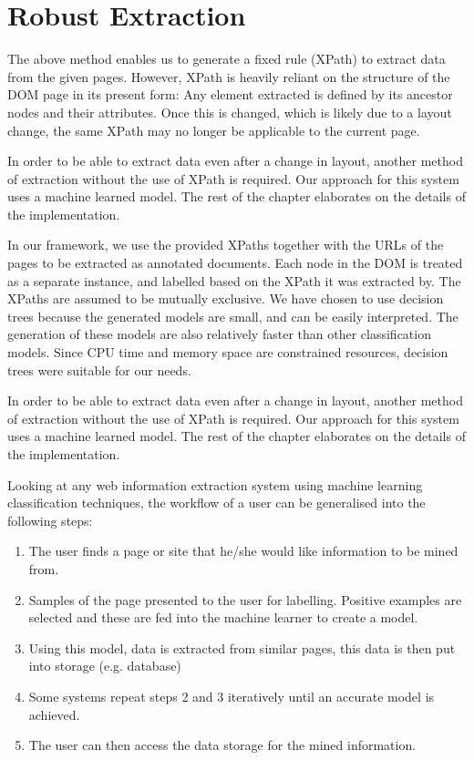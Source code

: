 \section{Robust Extraction}
\label{section:extraction}
The above method enables us to generate a fixed rule (XPath) to extract data from the given pages. However, XPath is heavily reliant on the structure of the DOM page in its present form: Any element extracted is defined by its ancestor nodes and their attributes. Once this is changed, which is likely due to a layout change, the same XPath may no longer be applicable to the current page. 

In order to be able to extract data even after a change in layout, another method of extraction without the use of XPath is required. Our approach for this system uses a machine learned model. The rest of the chapter elaborates on the details of the implementation.

In our framework, we use the provided XPaths together with the URLs of the pages to be extracted as annotated documents. Each node in the DOM is treated as a separate instance, and labelled based on the XPath it was extracted by. The XPaths are assumed to be mutually exclusive. We have chosen to use decision trees because the generated models are small, and can be easily interpreted. The generation of these models are also relatively faster than other classification models. Since CPU time and memory space are constrained resources, decision trees were suitable for our needs.



In order to be able to extract data even after a change in layout, another method of extraction without the use of XPath is required. Our approach for this system uses a machine learned model. The rest of the chapter elaborates on the details of the implementation.

	
Looking at any web information extraction system using machine learning classification techniques, the workflow of a user can be generalised into the following steps:
\begin{enumerate}
	\item The user finds a page or site that he/she would like information to be mined from.
	\item Samples of the page presented to the user for labelling. Positive examples are selected and these are fed into the machine learner to create a model.
	\item Using this model, data is extracted from similar pages, this data is then put into storage (e.g. database)
	\item Some systems repeat steps 2 and 3 iteratively until an accurate model is achieved.
	\item The user can then access the data storage for the mined information.
\end{enumerate}

